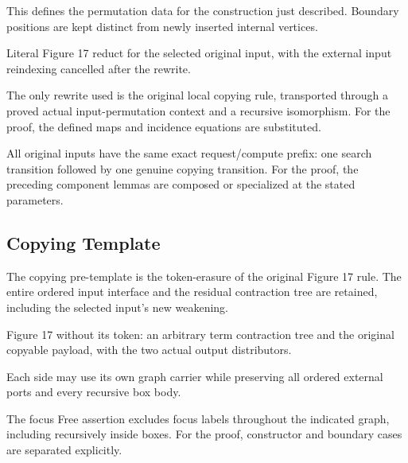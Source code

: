 This defines the permutation data for the construction just described. Boundary positions are kept distinct from newly inserted internal vertices.
\par{}

Literal Figure 17 reduct for the selected original input, with the external input reindexing cancelled after the rewrite.
\par{}

The only rewrite used is the original local copying rule, transported through a proved actual input-permutation context and a recursive isomorphism.
For the proof, the defined maps and incidence equations are substituted.
\par{}

All original inputs have the same exact request/compute prefix: one search transition followed by one genuine copying transition.
For the proof, the preceding component lemmas are composed or specialized at the stated parameters.
\par{}

\subsection{Copying Template}
The copying pre-template is the token-erasure of the original Figure 17 rule. The entire ordered input interface and the residual contraction tree are retained, including the selected input's new weakening.

Figure 17 without its token: an arbitrary term contraction tree and the original copyable payload, with the two actual output distributors.
\par{}

Each side may use its own graph carrier while preserving all ordered external ports and every recursive box body.
\par{}

The focus Free assertion excludes focus labels throughout the indicated graph, including recursively inside boxes.
For the proof, constructor and boundary cases are separated explicitly.
\par{}

